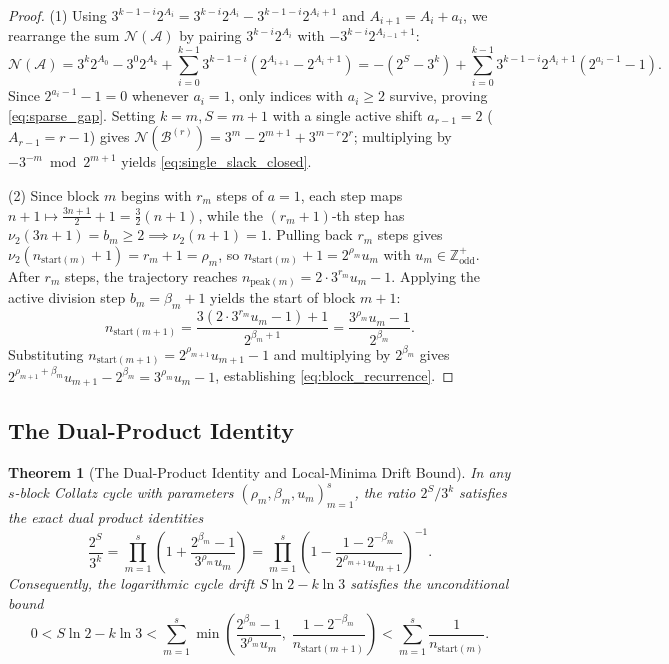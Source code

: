\documentclass[11pt, a4paper]{amsart}
\newtheorem{theorem}{Theorem}[section]
\theoremstyle{definition}
\newcommand{\Z}{\mathbb{Z}}
\newcommand{\N}{\mathcal{N}}
\newcommand{\A}{\mathcal{A}}
\begin{document}
\begin{proof}
(1) Using $3^{k-1-i} 2^{A_i} = 3^{k-i} 2^{A_i} - 3^{k-1-i} 2^{A_i + 1}$ and $A_{i+1} = A_i + a_i$, we rearrange the sum $\N(\A)$ by pairing $3^{k-i} 2^{A_i}$ with $-3^{k-i} 2^{A_{i-1}+1}$:
\[
\N(\A) = 3^k 2^{A_0} - 3^0 2^{A_k} + \sum_{i=0}^{k-1} 3^{k-1-i}\left(2^{A_{i+1}} - 2^{A_i + 1}\right) = -(2^S - 3^k) + \sum_{i=0}^{k-1} 3^{k-1-i} 2^{A_i + 1}\left(2^{a_i - 1} - 1\right).
\]
Since $2^{a_i - 1} - 1 = 0$ whenever $a_i = 1$, only indices with $a_i \ge 2$ survive, proving \eqref{eq:sparse_gap}. Setting $k=m, S=m+1$ with a single active shift $a_{r-1} = 2$ ($A_{r-1} = r - 1$) gives $\N(\mathcal{B}^{(r)}) = 3^m - 2^{m+1} + 3^{m-r} 2^r$; multiplying by $-3^{-m} \bmod 2^{m+1}$ yields \eqref{eq:single_slack_closed}.

(2) Since block $m$ begins with $r_m$ steps of $a = 1$, each step maps $n + 1 \mapsto \frac{3n+1}{2} + 1 = \frac{3}{2}(n+1)$, while the $(r_m+1)$-th step has $\nu_2(3n + 1) = b_m \ge 2 \implies \nu_2(n + 1) = 1$. Pulling back $r_m$ steps gives $\nu_2(n_{\text{start}(m)} + 1) = r_m + 1 = \rho_m$, so $n_{\text{start}(m)} + 1 = 2^{\rho_m} u_m$ with $u_m \in \Z_{\text{odd}}^+$. After $r_m$ steps, the trajectory reaches $n_{\text{peak}(m)} = 2 \cdot 3^{r_m} u_m - 1$. Applying the active division step $b_m = \beta_m + 1$ yields the start of block $m+1$:
\[
n_{\text{start}(m+1)} = \frac{3(2 \cdot 3^{r_m} u_m - 1) + 1}{2^{\beta_m + 1}} = \frac{3^{\rho_m} u_m - 1}{2^{\beta_m}}.
\]
Substituting $n_{\text{start}(m+1)} = 2^{\rho_{m+1}} u_{m+1} - 1$ and multiplying by $2^{\beta_m}$ gives $2^{\rho_{m+1} + \beta_m} u_{m+1} - 2^{\beta_m} = 3^{\rho_m} u_m - 1$, establishing \eqref{eq:block_recurrence}.
\end{proof}

\subsection{The Dual-Product Identity}

\begin{theorem}[The Dual-Product Identity and Local-Minima Drift Bound]\label{thm:dual_product}
In any $s$-block Collatz cycle with parameters $(\rho_m, \beta_m, u_m)_{m=1}^s$, the ratio $2^S / 3^k$ satisfies the exact dual product identities
\begin{equation}\label{eq:dual_product}
\frac{2^S}{3^k} = \prod_{m=1}^s \left( 1 + \frac{2^{\beta_m} - 1}{3^{\rho_m} u_m} \right) = \prod_{m=1}^s \left( 1 - \frac{1 - 2^{-\beta_m}}{2^{\rho_{m+1}} u_{m+1}} \right)^{-1}.
\end{equation}
Consequently, the logarithmic cycle drift $S \ln 2 - k \ln 3$ satisfies the unconditional bound
\begin{equation}\label{eq:dual_drift_bound}
0 < S \ln 2 - k \ln 3 < \sum_{m=1}^s \min\left( \frac{2^{\beta_m} - 1}{3^{\rho_m} u_m}, \; \frac{1 - 2^{-\beta_m}}{n_{\text{start}(m+1)}} \right) < \sum_{m=1}^s \frac{1}{n_{\text{start}(m)}}.
\end{equation}
\end{theorem}
\end{document}
